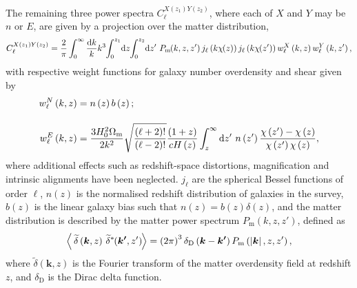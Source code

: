 The remaining three power spectra $C_\ell^{X \left( z_1 \right) Y \left( z_2 \right) }$, where each of $X$ and $Y$ may be $n$ or $E$, are given by a projection over the matter distribution,
\begin{equation}
C_\ell^{X \left( z_1 \right) Y \left( z_2 \right) }
= \frac{2}{\pi}
\int_0^\infty
\frac{\text{d}k}{k} k^3
\hspace{-.2em}
\int_0^{z_1}
\hspace{-.2em}
\text{d}z
\hspace{-.2em}
\int_0^{z_2}
\hspace{-.2em}
\text{d}z'~
P_\text{m} \hspace{-.25em}
\left( k, z, z' \right)
j_\ell \left( k \chi \hspace{-.25em} \left( z \right) \right)
j_\ell \left( k \chi \hspace{-.25em} \left( z' \right) \right)
w^X_\ell \left( k, z \right)
w^Y_\ell \left( k, z' \right),
\label{est_Eqn:cl_general}
\end{equation}
with respective weight functions for galaxy number overdensity and shear given by
\begin{align}
w^N_\ell \left( k, z \right) &=
n \left( z \right) b \left( z \right);
\\[1em]
w^E_\ell \left( k, z \right) &=
\frac{3 H_0^2 \Omega_\text{m}}{2 k^2}
\sqrt{\frac{\left( \ell + 2 \right)!}{\left( \ell - 2 \right)!}}
\frac{\left( 1 + z \right)}{c H \left( z \right)}
\int_z^\infty \text{d}z' ~
n \left( z' \right)
\frac{\chi \left( z' \right) - \chi \left( z \right)}
{\chi \left( z' \right) \chi \left( z \right)},
\end{align}
where additional effects such as redshift-space distortions, magnification and intrinsic alignments have been neglected. $j_\ell$ are the spherical Bessel functions of order $\ell$, $n \left( z \right)$ is the normalised redshift distribution of galaxies in the survey, $b \left( z \right)$ is the linear galaxy bias such that $n \left( z \right) = b \left( z \right) \delta \left( z \right)$, and the matter distribution is described by the matter power spectrum $P_\text{m} \left( k, z, z' \right)$, defined as
\begin{equation}
\left\langle \,
\widetilde{\delta} \left( \bm{k}, z \right) \,
\widetilde{\delta}^*  \hspace{-.25em}\left( \bm{k'}, z' \right)
\hspace{-.1em}
\right\rangle
= \left( 2 \pi \right)^3
\delta_\text{D} \left( \bm{k} - \bm{k'} \right)
P_\text{m} \left( \left| \bm{k} \right|, z, z' \right),
\end{equation}
where $\widetilde{\delta} \left( \bm{k}, z \right)$ is the Fourier transform of the matter overdensity field at redshift $z$, and $\delta_\text{D}$ is the Dirac delta function.

